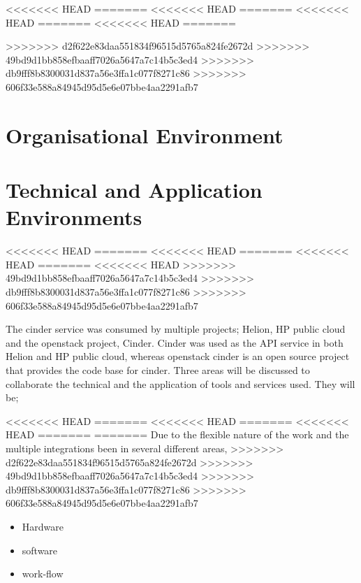 \documentclass[11pt,a4paper]{report}
\begin{document}
<<<<<<< HEAD
\tableofcontents
\newpage
=======
<<<<<<< HEAD
\tableofcontents
\newpage
=======
<<<<<<< HEAD
\tableofcontents
\newpage
=======
<<<<<<< HEAD
\tableofcontents
\newpage
=======

>>>>>>> d2f622e83daa551834f96515d5765a824fe2672d
>>>>>>> 49bd9d1bb858efbaaff7026a5647a7c14b5c3ed4
>>>>>>> db9fff8b8300031d837a56e3ffa1c077f8271c86
>>>>>>> 606f33e588a84945d95d5e6e07bbe4aa2291afb7
\section{Organisational Environment}
 


\section{Technical and Application Environments}
<<<<<<< HEAD
=======
<<<<<<< HEAD
=======
<<<<<<< HEAD
=======
<<<<<<< HEAD
>>>>>>> 49bd9d1bb858efbaaff7026a5647a7c14b5c3ed4
>>>>>>> db9fff8b8300031d837a56e3ffa1c077f8271c86
>>>>>>> 606f33e588a84945d95d5e6e07bbe4aa2291afb7


The cinder service was consumed by multiple projects; Helion, HP public cloud and the openstack project, Cinder. Cinder was used as the API service in both Helion and HP public cloud, whereas openstack cinder is an open source project that provides the code base for cinder. Three areas will be discussed to collaborate the technical and the application of tools and services used. They will be;

<<<<<<< HEAD
=======
<<<<<<< HEAD
=======
<<<<<<< HEAD
=======
=======
Due to the flexible nature of the work and the multiple integrations  been in several different areas, 
>>>>>>> d2f622e83daa551834f96515d5765a824fe2672d
>>>>>>> 49bd9d1bb858efbaaff7026a5647a7c14b5c3ed4
>>>>>>> db9fff8b8300031d837a56e3ffa1c077f8271c86
>>>>>>> 606f33e588a84945d95d5e6e07bbe4aa2291afb7
\begin{itemize}
\item Hardware
\item software
\item work-flow
\end{itemize} 
\end{document}
